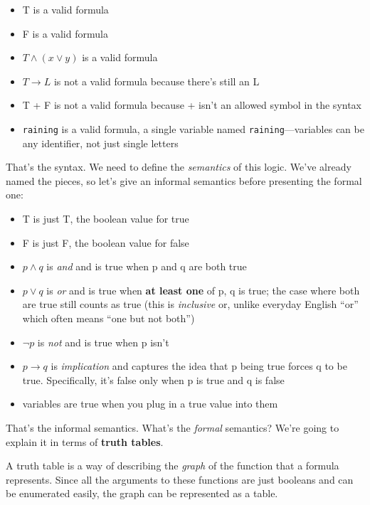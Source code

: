 \documentclass[11pt]{article}
\begin{document}
\begin{itemize}
  \item T is a valid formula
  \item F is a valid formula
  \item $T \wedge (x \vee y)$ is a valid formula
  \item $T \to L$ is not a valid formula because there's still an L
  \item T + F is not a valid formula because + isn't an allowed symbol in the syntax
  \item \texttt{raining} is a valid formula, a single variable named \texttt{raining}---variables can be any identifier, not just single letters
\end{itemize}

That's the syntax. We need to define the \emph{semantics} of this logic. We've already named the pieces, so let's give an informal semantics before presenting the formal one:

\begin{itemize}
  \item T is just T, the boolean value for true
  \item F is just F, the boolean value for false
  \item $p \wedge q$ is \emph{and} and is true when p and q are both true
  \item $p \vee q$ is \emph{or} and is true when \textbf{at least one} of p, q is true; the case where both are true still counts as true (this is \emph{inclusive} or, unlike everyday English ``or'' which often means ``one but not both'')
  \item $\lnot p$ is \emph{not} and is true when p isn't
  \item $p \to q$ is \emph{implication} and captures the idea that p being true forces q to be true. Specifically, it's false only when p is true and q is false
  \item variables are true when you plug in a true value into them
\end{itemize}

That's the informal semantics. What's the \emph{formal} semantics? We're going to explain it in terms of \textbf{truth tables}.

A truth table is a way of describing the \emph{graph} of the function that a formula represents. Since all the arguments to these functions are just booleans and can be enumerated easily, the graph can be represented as a table.
\end{document}
